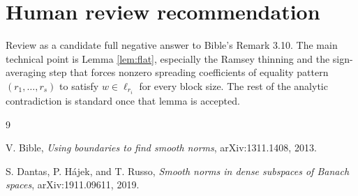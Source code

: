\documentclass[11pt]{article}
\begin{document}
\section{Human review recommendation}

Review as a candidate full negative answer to Bible's Remark 3.10.  The main
technical point is Lemma \ref{lem:flat}, especially the Ramsey thinning and
the sign-averaging step that forces nonzero spreading coefficients of equality
pattern \((r_1,\ldots,r_s)\) to satisfy \(w\in\ell_{r_i}\) for every block
size.  The rest of the analytic contradiction is standard once that lemma is
accepted.

\begin{thebibliography}{9}

V. Bible,
\emph{Using boundaries to find smooth norms},
arXiv:1311.1408, 2013.

S. Dantas, P. H\'ajek, and T. Russo,
\emph{Smooth norms in dense subspaces of Banach spaces},
arXiv:1911.09611, 2019.

\end{thebibliography}
\end{document}
